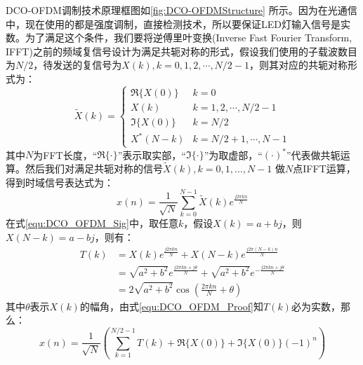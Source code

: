 DCO-OFDM调制技术原理框图如\autoref{fig:DCO-OFDMStructure} 所示。因为在光通信中，现在使用的都是强度调制，直接检测技术，所以要保证LED灯输入信号是实数。为了满足这个条件，我们要将逆傅里叶变换(Inverse Fast Fourier Transform, IFFT)之前的频域复信号设计为满足共轭对称的形式\cite{proakisdigital}，假设我们使用的子载波数目为$N/2$，待发送的复信号为$X(k),k = 0, 1, 2, \cdots, N/2-1$，则其对应的共轭对称形式为：
\begin{equation}
    \tilde{X}(k) =
    \begin{cases}
        \Re\{X(0)\}  & k = 0 \\
        X(k) & k = 1, 2, \cdots, N/2-1 \\
        \Im\{X(0)\} & k = N/2 \\
        X^*(N-k) & k = N/2+1, \cdots, N-1
    \end{cases}
    \label{equ:HermitianSymmetry}
\end{equation}
其中$N$为FFT长度，“$\Re\{\cdot\}$”表示取实部，“$\Im\{\cdot\}$”为取虚部，“$(\cdot)^*$”代表做共轭运算。然后我们对满足共轭对称的信号$\tilde{X}(k),k=0,1,...,N-1$ 做$N$点IFFT运算，得到时域信号表达式为：
\begin{equation}
    x(n) = \frac{1}{\sqrt{N}}\sum \limits_{k=0}^{N-1}\tilde{X}(k)e^{\frac{j2\pi kn}{N}}
    \label{equ:DCO_OFDM_Sig}
\end{equation}
在式\ref{equ:DCO_OFDM_Sig}中，取任意$k$，假设$X(k)=a+bj$，则$X(N-k)=a-bj$，则有：
\begin{align}
    T(k) &= X(k)e^{\frac{j2\pi kn}{N}}+X(N-k)e^{\frac{j2\pi (N-k)n}{N}}\nonumber  \\
    &=\sqrt{a^2+b^2}e^{\frac{j2\pi kn+j\theta}{N}}+\sqrt{a^2+b^2}e^{-\frac{j2\pi kn+j\theta}{N}}\nonumber \\
    &=2\sqrt{a^2+b^2}\cos(\frac{2\pi kn}{N}+\theta)
    \label{equ:DCO_OFDM_Proof}
\end{align}
其中$\theta$表示$X(k)$的幅角，由式\ref{equ:DCO_OFDM_Proof}知$T(k)$必为实数，那么：
\begin{equation}
    x(n)=\frac{1}{\sqrt{N}}(\sum \limits_{k=1}^{N/2-1}T(k)+ \Re\{X(0)\} +\Im\{X(0)\}(-1)^n)
\end{equation}

